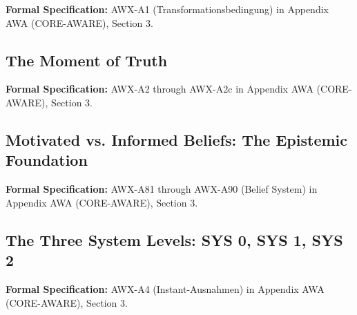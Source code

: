 \begin{cross-reference}
\textbf{Formal Specification:} AWX-A1 (Transformationsbedingung) in
Appendix AWA (CORE-AWARE), Section 3.
\end{cross-reference}

\subsection{The Moment of Truth}
\label{subsec:11-2-moment-of-truth}



\begin{cross-reference}
\textbf{Formal Specification:} AWX-A2 through AWX-A2c in
Appendix AWA (CORE-AWARE), Section 3.
\end{cross-reference}

\subsection{Motivated vs. Informed Beliefs: The Epistemic Foundation}
\label{subsec:11-3-beliefs}



\begin{cross-reference}
\textbf{Formal Specification:} AWX-A81 through AWX-A90 (Belief System) in
Appendix AWA (CORE-AWARE), Section 3.
\end{cross-reference}

\subsection{The Three System Levels: SYS 0, SYS 1, SYS 2}
\label{subsec:11-4-system-levels}



\begin{cross-reference}
\textbf{Formal Specification:} AWX-A4 (Instant-Ausnahmen) in
Appendix AWA (CORE-AWARE), Section 3.
\end{cross-reference}

